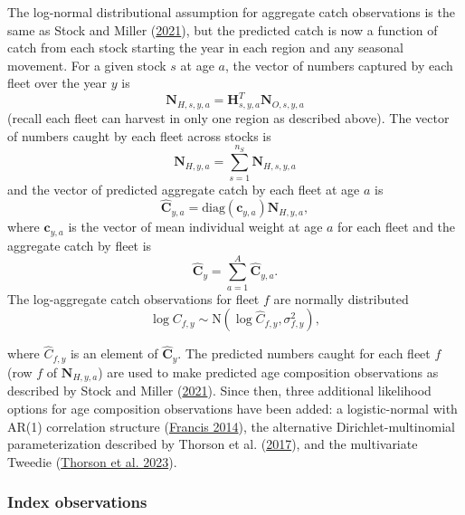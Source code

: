 \documentclass[
]{article}
\begin{document}
The log-normal distributional assumption for aggregate catch observations is the same as Stock and Miller (\protect\hyperlink{ref-stockmiller21}{2021}), but the predicted catch is now a function of catch from each stock starting the year in each region and any seasonal movement. For a given stock \(s\) at age \(a\), the vector of numbers captured by each fleet over the year \(y\) is
\[\mathbf{N}_{H,s,y,a} = \mathbf{H}_{s,y,a}^T \mathbf{N}_{O,s,y,a}\]
(recall each fleet can harvest in only one region as described above). The vector of numbers caught by each fleet across stocks is
\[\mathbf{N}_{H,y,a} = \sum^{n_S}_{s=1} \mathbf{N}_{H,s,y,a}\]
and the vector of predicted aggregate catch by each fleet at age \(a\) is
\[\widehat{\mathbf{C}}_{y,a} = \text{diag}\left(\mathbf{c}_{y,a}\right) \mathbf{N}_{H,y,a},\]
where \(\mathbf{c}_{y,a}\) is the vector of mean individual weight at age \(a\) for each fleet and the aggregate catch by fleet is
\[\widehat{\mathbf{C}}_y = \sum^{A}_{a=1} \widehat{\mathbf{C}}_{y,a}.\]
The log-aggregate catch observations for fleet \(f\) are normally distributed
\[ \log C_{f,y} \sim \text{N}\left(\log \widehat {C}_{f,y}, \sigma^2_{f,y}\right),\]

where \(\widehat C_{f,y}\) is an element of \(\widehat{\mathbf{C}}_y\). The predicted numbers caught for each fleet \(f\) (row \(f\) of \(\mathbf{N}_{H,y,a}\)) are used to make predicted age composition observations as described by Stock and Miller (\protect\hyperlink{ref-stockmiller21}{2021}). Since then, three additional likelihood options for age composition observations have been added: a logistic-normal with AR(1) correlation structure (\protect\hyperlink{ref-francis14}{Francis 2014}), the alternative Dirichlet-multinomial parameterization described by Thorson et al. (\protect\hyperlink{ref-thorsonetal17}{2017}), and the multivariate Tweedie (\protect\hyperlink{ref-thorsonetal23}{Thorson et al. 2023}).

\hypertarget{index-observations}{%
\subsubsection*{Index observations}\label{index-observations}}
\end{document}
